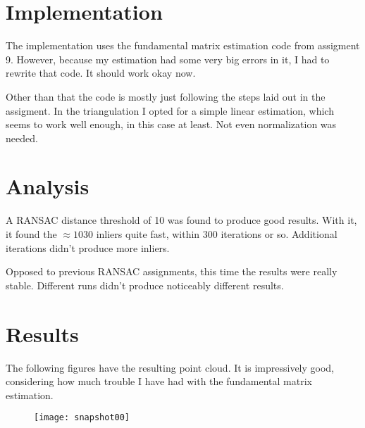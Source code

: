 



\section{Implementation}

The implementation uses the fundamental matrix estimation code from assigment
9. However, because my estimation had some very big errors in it, I had to
rewrite that code. It should work okay now.

Other than that the code is mostly just following the steps laid out in the
assigment. In the triangulation I opted for a simple linear estimation, which
seems to work well enough, in this case at least. Not even normalization was
needed.


\section{Analysis}

A RANSAC distance threshold of 10 was found to produce good results. With it,
it found the \(\approx1030\) inliers quite fast, within 300 iterations or so.
Additional iterations didn't produce more inliers.

Opposed to previous RANSAC assignments, this time the results were really
stable. Different runs didn't produce noticeably different results.


\section{Results}

The following figures have the resulting point cloud. It is impressively good,
considering how much trouble I have had with the fundamental matrix estimation.

\begin{figure}[h]
  \centering
  \texttt{[image: snapshot00]}
\end{figure}

